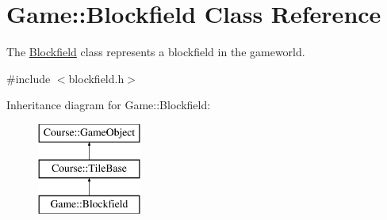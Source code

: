 \hypertarget{classGame_1_1Blockfield}{\section{Game\-:\-:Blockfield Class Reference}
\label{classGame_1_1Blockfield}
}


The \hyperlink{classGame_1_1Blockfield}{Blockfield} class represents a blockfield in the gameworld.  




{\ttfamily \#include $<$blockfield.\-h$>$}

Inheritance diagram for Game\-:\-:Blockfield\-:\begin{figure}[H]
\begin{center}
\leavevmode
\includegraphics[height=3.000000cm]{classGame_1_1Blockfield}
\end{center}
\end{figure}
